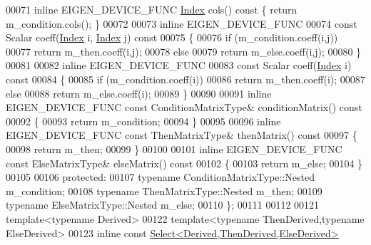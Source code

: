 \begin{DoxyCode}
00071     \textcolor{keyword}{inline} EIGEN\_DEVICE\_FUNC \hyperlink{namespace_eigen_a62e77e0933482dafde8fe197d9a2cfde}{Index} cols()\textcolor{keyword}{ const }\{ \textcolor{keywordflow}{return} m\_condition.cols(); \}
00072 
00073     \textcolor{keyword}{inline} EIGEN\_DEVICE\_FUNC
00074     \textcolor{keyword}{const} Scalar coeff(\hyperlink{namespace_eigen_a62e77e0933482dafde8fe197d9a2cfde}{Index} i, \hyperlink{namespace_eigen_a62e77e0933482dafde8fe197d9a2cfde}{Index} j)\textcolor{keyword}{ const}
00075 \textcolor{keyword}{    }\{
00076       \textcolor{keywordflow}{if} (m\_condition.coeff(i,j))
00077         \textcolor{keywordflow}{return} m\_then.coeff(i,j);
00078       \textcolor{keywordflow}{else}
00079         \textcolor{keywordflow}{return} m\_else.coeff(i,j);
00080     \}
00081 
00082     \textcolor{keyword}{inline} EIGEN\_DEVICE\_FUNC
00083     \textcolor{keyword}{const} Scalar coeff(\hyperlink{namespace_eigen_a62e77e0933482dafde8fe197d9a2cfde}{Index} i)\textcolor{keyword}{ const}
00084 \textcolor{keyword}{    }\{
00085       \textcolor{keywordflow}{if} (m\_condition.coeff(i))
00086         \textcolor{keywordflow}{return} m\_then.coeff(i);
00087       \textcolor{keywordflow}{else}
00088         \textcolor{keywordflow}{return} m\_else.coeff(i);
00089     \}
00090 
00091     \textcolor{keyword}{inline} EIGEN\_DEVICE\_FUNC \textcolor{keyword}{const} ConditionMatrixType& conditionMatrix()\textcolor{keyword}{ const}
00092 \textcolor{keyword}{    }\{
00093       \textcolor{keywordflow}{return} m\_condition;
00094     \}
00095 
00096     \textcolor{keyword}{inline} EIGEN\_DEVICE\_FUNC \textcolor{keyword}{const} ThenMatrixType& thenMatrix()\textcolor{keyword}{ const}
00097 \textcolor{keyword}{    }\{
00098       \textcolor{keywordflow}{return} m\_then;
00099     \}
00100 
00101     \textcolor{keyword}{inline} EIGEN\_DEVICE\_FUNC \textcolor{keyword}{const} ElseMatrixType& elseMatrix()\textcolor{keyword}{ const}
00102 \textcolor{keyword}{    }\{
00103       \textcolor{keywordflow}{return} m\_else;
00104     \}
00105 
00106   \textcolor{keyword}{protected}:
00107     \textcolor{keyword}{typename} ConditionMatrixType::Nested m\_condition;
00108     \textcolor{keyword}{typename} ThenMatrixType::Nested m\_then;
00109     \textcolor{keyword}{typename} ElseMatrixType::Nested m\_else;
00110 \};
00111 
00112 
00121 \textcolor{keyword}{template}<\textcolor{keyword}{typename} Derived>
00122 \textcolor{keyword}{template}<\textcolor{keyword}{typename} ThenDerived,\textcolor{keyword}{typename} ElseDerived>
00123 \textcolor{keyword}{inline} \textcolor{keyword}{const} \hyperlink{group___core___module_class_eigen_1_1_select}{Select<Derived,ThenDerived,ElseDerived>}

\end{DoxyCode}
